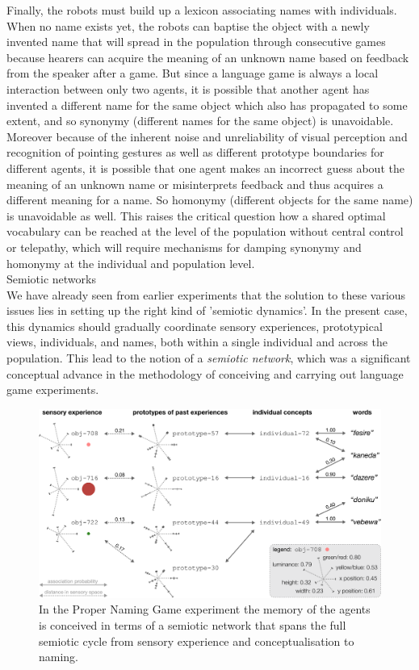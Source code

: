 Finally, the robots must build up a lexicon associating names with individuals. When no name
exists yet, the robots can baptise the object with a newly invented name that
will spread in the population through consecutive games because
hearers can acquire the meaning of an unknown name based on feedback
from the speaker after a game. But since a language game is always a
local interaction between only two agents, it is possible that another
agent has invented a different name for the same object which also has
propagated to some extent, and so synonymy (different names for the
same object) is unavoidable. Moreover because of the inherent noise
and unreliability of visual perception and recognition of pointing
gestures as well as different prototype boundaries for different
agents, it is possible that one agent makes an incorrect guess about
the meaning of an unknown name or misinterprets feedback and thus
acquires a different meaning for a name. So homonymy (different
objects for the same name) is unavoidable as well. This raises the
critical question how a shared optimal vocabulary can be reached at
the level of the population without central control or telepathy,
which will require mechanisms for damping synonymy and homonymy at the
individual and population level.\\

{\bfshape Semiotic networks}\\

We have already seen from earlier experiments that the solution to these various issues lies in setting up
the right kind of 'semiotic dynamics'. In the present case, this dynamics should gradually coordinate
sensory experiences, prototypical views, individuals, 
and names, both within a single individual and across the
population. This lead to the notion of a {\itshape semiotic network}, which was a significant conceptual advance 
in the methodology of conceiving and carrying out language game experiments.

\begin{figure}[htbp]
  \centerline{\includegraphics[width=.95\textwidth]{chap10/figs/prototypes-identifiers-words}}
\caption{\label{fig:prototypes-identifiers-words} 
In the Proper Naming Game experiment the memory of the agents is conceived in terms of a semiotic network that 
spans the full semiotic cycle from sensory experience and conceptualisation to naming.}
\end{figure}


